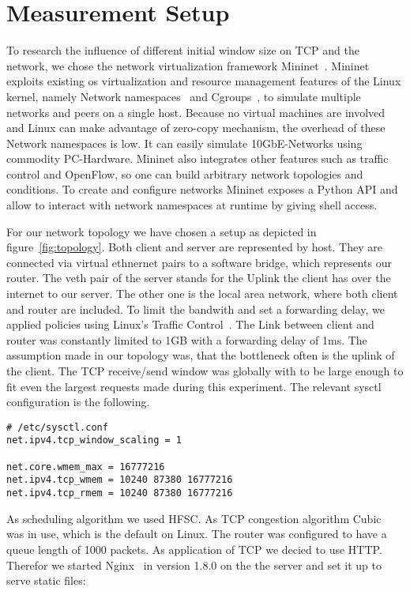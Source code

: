 \section{Measurement Setup}
\label{sec:measurement_setup}

To research the influence of different initial window size on TCP and the
network, we chose the network virtualization framework Mininet~\cite{mininet}.
Mininet exploits existing os virtualization and resource management features of
the Linux kernel, namely Network namespaces~\cite{network_namespaces} and
Cgroups~\cite{cgroups}, to simulate multiple networks and peers on a single
host. Because no virtual machines are involved and Linux can make advantage of
zero-copy mechanism, the overhead of these Network namespaces is low. It can
easily simulate 10GbE-Networks using commodity PC-Hardware. Mininet also
integrates other features such as traffic control and OpenFlow, so one can build
arbitrary network topologies and conditions. To create and configure networks
Mininet exposes a Python API and allow to interact with network namespaces at
runtime by giving shell access.



For our network topology we have chosen a setup as depicted in figure~\ref{fig:topology}.
Both client and server are represented by host. They are connected via virtual
ethnernet pairs to a software bridge, which represents our router. The veth pair
of the server stands for the Uplink the client has over the internet to our
server. The other one is the local area network, where both client and router
are included. To limit the bandwith and set a forwarding delay, we applied
policies using Linux's Traffic Control~\cite{tc}. The Link between client and
router was constantly limited to 1GB with a forwarding delay of 1ms. The
assumption made in our topology was, that the bottleneck often is the uplink of
the client. The TCP receive/send window was globally with to be large enough to
fit even the largest requests made during this experiment. The relevant sysctl
configuration is the following.

\begin{lstlisting}
# /etc/sysctl.conf
net.ipv4.tcp_window_scaling = 1

net.core.wmem_max = 16777216
net.ipv4.tcp_wmem = 10240 87380 16777216
net.ipv4.tcp_rmem = 10240 87380 16777216
\end{lstlisting}

As scheduling algorithm we used HFSC. As TCP congestion algorithm
Cubic~\cite{cubic} was in use, which is the default on Linux. The router was
configured to have a queue length of 1000 packets. As application of TCP we
decied to use HTTP. Therefor we started Nginx~\cite{nginx} in version 1.8.0 on
the the server and set it up to serve static files:

